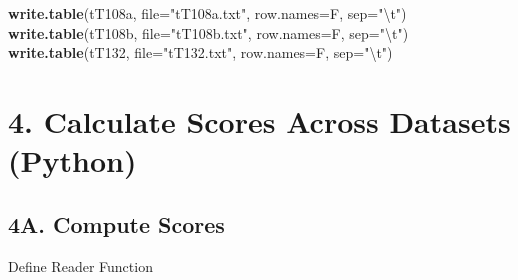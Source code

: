 \documentclass[
]{article}
\newenvironment{Shaded}{\begin{snugshade}}{\end{snugshade}}
\newcommand{\CharTok}[1]{\textcolor[rgb]{0.31,0.60,0.02}{#1}}
\newcommand{\DataTypeTok}[1]{\textcolor[rgb]{0.13,0.29,0.53}{#1}}
\newcommand{\KeywordTok}[1]{\textcolor[rgb]{0.13,0.29,0.53}{\textbf{#1}}}
\newcommand{\NormalTok}[1]{#1}
\newcommand{\StringTok}[1]{\textcolor[rgb]{0.31,0.60,0.02}{#1}}
\begin{document}
\begin{Shaded}
\begin{Highlighting}[]
\KeywordTok{write.table}\NormalTok{(tT108a, }\DataTypeTok{file=}\StringTok{"tT108a.txt"}\NormalTok{, }\DataTypeTok{row.names=}\NormalTok{F, }\DataTypeTok{sep=}\StringTok{"}\CharTok{\textbackslash{}t}\StringTok{"}\NormalTok{)}
\KeywordTok{write.table}\NormalTok{(tT108b, }\DataTypeTok{file=}\StringTok{"tT108b.txt"}\NormalTok{, }\DataTypeTok{row.names=}\NormalTok{F, }\DataTypeTok{sep=}\StringTok{"}\CharTok{\textbackslash{}t}\StringTok{"}\NormalTok{)}
\KeywordTok{write.table}\NormalTok{(tT132, }\DataTypeTok{file=}\StringTok{"tT132.txt"}\NormalTok{, }\DataTypeTok{row.names=}\NormalTok{F, }\DataTypeTok{sep=}\StringTok{"}\CharTok{\textbackslash{}t}\StringTok{"}\NormalTok{)}
\end{Highlighting}
\end{Shaded}

\hypertarget{calculate-scores-across-datasets-python}{%
\section{4. Calculate Scores Across Datasets
(Python)}\label{calculate-scores-across-datasets-python}}

\hypertarget{a.-compute-scores}{%
\subsection{4A. Compute Scores}\label{a.-compute-scores}}

Define Reader Function
\end{document}
